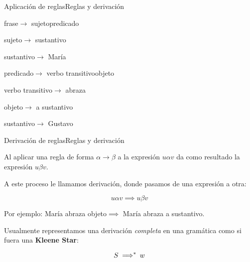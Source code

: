 \documentclass[spanish]{beamer}
\begin{document}
\begin{frame}{Aplicación de reglas}{Reglas y derivación}
     \pause
    
    \textlangle frase\textrangle $\to$ \textlangle \alert<3>{sujeto}\textrangle \textlangle \alert<5>{predicado}\textrangle \pause

    \bigskip

    \textlangle \alert<3>{sujeto}\textrangle $\to$ \textlangle \alert<4>{sustantivo}\textrangle \pause

    \bigskip
            
    \textlangle \alert<4>{sustantivo}\textrangle $\to$ \alert<9>{María} \pause

    \bigskip

    \textlangle \alert<5>{predicado}\textrangle $\to$ \textlangle \alert<6>{verbo transitivo}\textrangle \textlangle \alert<7>{objeto}\textrangle \pause

    \bigskip

    \textlangle \alert<6>{verbo transitivo}\textrangle $\to$ \alert<9>{abraza} \pause

    \bigskip

    \textlangle \alert<7>{objeto}\textrangle $\to$ \alert<9>{a} \textlangle \alert<8>{sustantivo}\textrangle \pause

    \bigskip

    \textlangle \alert<8>{sustantivo}\textrangle $\to$ \alert<9>{Gustavo} \pause

    \bigskip

    \begin{center}
    \end{center}

\end{frame}

\begin{frame}{Derivación de reglas}{Reglas y derivación}
    
    Al aplicar una regla de forma $\alpha \to \beta$ a la expresión $u \alpha v$ da como resultado la expresión $u \beta v$. \pause

    \bigskip

    A este proceso le llamamos \alert{derivación}, donde pasamos de una expresión a otra:
    
    \[u \alpha v \implies u \beta v\] \pause

    Por ejemplo: María abraza \textlangle objeto\textrangle $\implies$ María abraza a \textlangle sustantivo\textrangle. \pause

    \bigskip

    Usualmente representamos una derivación \textit{completa} en una gramática como si fuera una \textbf{Kleene Star}:

    \[S \implies\mkern-10mu ^{*} \enspace w\]
    
\end{frame}
\end{document}
